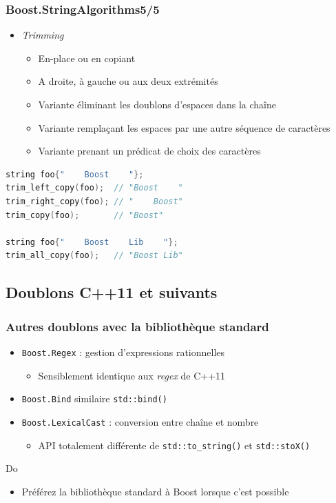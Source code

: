 \documentclass[C++.tex]{subfiles}
\begin{document}
\begin{frame}[fragile]
	\frametitle{Boost.StringAlgorithms\titlehfill{}5/5}
	\begin{itemize}
		\item \textit{Trimming}
		\begin{itemize}
			\item En-place ou en copiant
			\item A droite, à gauche ou aux deux extrémités
			\item Variante éliminant les doublons \og d'espaces\fg{} dans la chaîne
			\item Variante remplaçant les \og espaces\fg{} par une autre séquence de caractères
			\item Variante prenant un prédicat de choix des caractères
		\end{itemize}
	\end{itemize}

	\begin{lstlisting}[language=C++]
string foo{"    Boost    "};
trim_left_copy(foo);  // "Boost    "
trim_right_copy(foo); // "    Boost"
trim_copy(foo);       // "Boost"

string foo{"    Boost    Lib    "};
trim_all_copy(foo);   // "Boost Lib"\end{lstlisting}
\end{frame}

\subsection*{Doublons C++11 et suivants}
\begin{frame}[fragile]
	\frametitle{Autres doublons avec la bibliothèque standard}
	\begin{itemize}
		\item \lstinline|Boost.Regex| : gestion d'expressions rationnelles
		\begin{itemize}
			\item Sensiblement identique aux \textit{regex} de C++11
		\end{itemize}
		\item \lstinline|Boost.Bind| similaire \lstinline|std::bind()|
		\item \lstinline|Boost.LexicalCast| : conversion entre chaîne et nombre
		\begin{itemize}
			\item API totalement différente de \lstinline|std::to_string()| et \lstinline|std::stoX()|
		\end{itemize}
	\end{itemize}

	\begin{exampleblock}{Do}
		\begin{itemize}
			\item Préférez la bibliothèque standard à Boost lorsque c'est possible
		\end{itemize}
	\end{exampleblock}
\end{frame}
\end{document}
